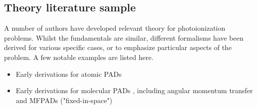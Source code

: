 \subsection{Theory literature sample\label{sec:theory-lit}}

A number of authors have developed relevant theory for photoionization problems. Whilst the fundamentals are similar, different formalisms have been derived for various specific cases, or to emphasize particular aspects of the problem. A few notable examples are listed here.

\begin{itemize}
\item Early derivations for atomic PADs \cite{Cherepkov1979,Cooper1968,Cooper1969,Klar1982}
\item Early derivations for molecular PADs \cite{Buckingham1970,Tully1968}, including angular momentum transfer \cite{Fano1972} and MFPADs ("fixed-in-space")
\end{itemize}